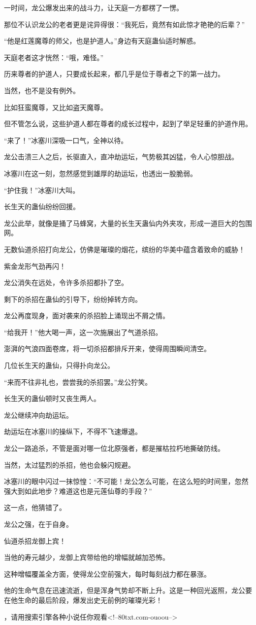 \begin{this_body}
一时间，龙公爆发出来的战斗力，让天庭一方都楞了一愣。

那位不认识龙公的老者更是诧异得很：“我死后，竟然有如此惊才艳艳的后辈？”

“他是红莲魔尊的师父，也是护道人。”身边有天庭蛊仙适时解惑。

天庭老者这才恍然：“哦，难怪。”

历来尊者的护道人，只要成长起来，都几乎是位于尊者之下的第一战力。

当然，也不是没有例外。

比如狂蛮魔尊，又比如盗天魔尊。

但不管怎么说，这些护道人都在尊者的成长过程中，起到了举足轻重的护道作用。

“来了！”冰塞川深吸一口气，全神以待。

龙公击溃三人之后，长驱直入，直冲劫运坛，气势极其凶猛，令人心惊胆战。

冰塞川在这一刻，忽然感觉到雄厚的劫运坛，也透出一股脆弱。

“护住我！”冰塞川大叫。

长生天的蛊仙纷纷回援。

龙公此举，就像是捅了马蜂窝，大量的长生天蛊仙内外夹攻，形成一道巨大的包围网。

无数仙道杀招打向龙公，仿佛是璀璨的烟花，缤纷的华美中蕴含着致命的威胁！

紫金龙形气劲再闪！

龙公消失在远处，令许多杀招都扑了空。

剩下的杀招在蛊仙的引导下，纷纷掉转方向。

龙公再度现身，面对袭来的杀招脸上涌现出不屑之情。

“给我开！”他大喝一声，这一次施展出了气道杀招。

澎湃的气浪四面卷席，将一切杀招都排斥开来，使得周围瞬间清空。

几位长生天的蛊仙，只得扑向龙公。

“来而不往非礼也，尝尝我的杀招罢。”龙公狞笑。

长生天的蛊仙顿时又丧生两人。

龙公继续冲向劫运坛。

劫运坛在冰塞川的操纵下，不得不飞速爆退。

龙公一路追杀，不管是面对哪一位北原强者，都是摧枯拉朽地撕破防线。

当然，太过猛烈的杀招，他也会躲闪规避。

冰塞川的眼中闪过一抹惊惶：“不可能！龙公怎么可能，在这么短的时间里，忽然强大到如此地步？难道这也是元莲仙尊的手段？”

这一点，他猜错了。

龙公之强，在于自身。

仙道杀招龙御上宾！

当他的寿元越少，龙御上宾带给他的增幅就越加恐怖。

这种增幅覆盖全方面，使得龙公空前强大，每时每刻战力都在暴涨。

他的生命气息在迅速流逝，但是浑身气势却不断上升。这是一种回光返照，龙公要在他生命的最后阶段，爆发出史无前例的璀璨光彩！

，请用搜索引擎各种小说任你观看<!--80txt.com-ouoou-->

\end{this_body}

